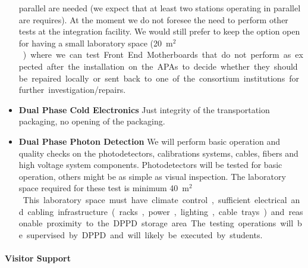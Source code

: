 \begin{itemize}
    parallel are needed (we expect that at least two stations
    operating in parallel are requires). At the moment we do not
    foresee the need to perform other tests at the integration
    facility. We would still prefer to keep the option open for having
    a small laboratory space (\SI{20}{m$^2$}) where we can test Front End
    Motherboards that do not perform as expected after the
    installation on the APAs to decide whether they should be repaired
    locally or sent back to one of the consortium institutions for
    further investigation/repairs.
   \item {\bf Dual Phase Cold Electronics} Just integrity of the
     transportation packaging, no opening of the packaging.
   \item {\bf Dual Phase Photon Detection} We will perform basic
     operation and quality checks on the photodetectors, calibrations
     systems, cables, fibers and high voltage system components.
     Photodetectors will be tested for basic operation, others might
     be as simple as visual inspection.  The laboratory space required
     for these test is minimum \SI{40}{m$^2$}. This laboratory space must
     have climate control, sufficient electrical and cabling
     infrastructure (racks, power, lighting, cable trays) and
     reasonable proximity to the DPPD storage area. The testing
     operations will be supervised by DPPD and will likely be executed
     by students.
\end{itemize}

\paragraph{\bf Visitor Support} 

